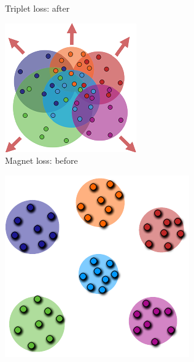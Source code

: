 \begin{figure}[h]
\begin{subfigure}[b]{0.245\textwidth}
    \caption{Triplet loss: after}
  \end{subfigure}
  \hfill
  \begin{subfigure}[b]{0.245\textwidth}
    \centering
    \includegraphics[width=\textwidth]{images/triplet-magnet-difference/magnet_before.pdf}
    \caption{Magnet loss: before}
  \end{subfigure}
  \hfill
  \begin{subfigure}[b]{0.245\textwidth}
    \centering
    \includegraphics[width=\textwidth]{images/triplet-magnet-difference/magnet_after.pdf}

\end{subfigure}
\end{figure}
